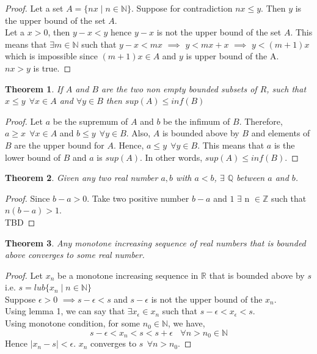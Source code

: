 \documentclass[12pt]{report}
\newtheorem{thm}{Theorem}
\begin{document}
\begin{proof}
    Let a set $A = \{nx \mid n \in \mathbb{N}\}$. Suppose for contradiction $ nx \leq y$. Then $y$ is the upper bound of the set $A$. \\
    Let a $x > 0$, then $ y - x < y$ hence $y - x$ is not the upper bound of the set $A$. This means that $\exists m \in \mathbb{N}$ such that $y - x < mx$ $\implies$ $y < mx + x$ $\implies$ $y < (m+1)x$ which is impossible since $(m+1)x \in A$ and $y$ is upper bound of the A.\\
    $ nx > y$ is true.
\end{proof}
\begin{thm}
    If $A$ and $B$ are the two non empty bounded subsets of $R$, such that $x \leq y ~~ \forall x \in A$ and $\forall y \in B$ then $sup(A) \leq inf(B)$
\end{thm}
\begin{proof}
    Let $a$ be the supremum of $A$ and $b$ be the infimum of $B$. Therefore, \linebreak $a \geq x~~\forall x \in A$ and $ b \leq y~~ \forall y \in B$. Also, $A$ is bounded above by $B$ and elements of $B$ are the upper bound for $A$. Hence, $a \leq y ~~ \forall y \in B$. This means that $a$ is the lower bound of $B$ and $a$ is $sup(A)$. In other words, $sup(A) \leq inf(B)$. 
\end{proof}
\begin{thm}
    Given any two real number $a,b$ with $a<b$, $\exists$ $\mathbb{Q}$ between $a$ and $b$.
\end{thm}
\begin{proof}
    Since $b-a > 0$. Take two positive number $b-a$ and $1$ $\exists$ n $\in \mathbb{Z}$ such that $n(b-a) > 1$.\\ TBD
\end{proof}
\begin{thm}
    Any monotone increasing sequence of real numbers that is bounded above converges to some real number.
\end{thm}
\begin{proof}
    Let $x_n$ be a monotone increasing sequence in $\mathbb{R}$ that is bounded above by $s$ i.e. $s = lub\{x_n \mid n \in \mathbb{N}\}$ \\
    Suppose $\epsilon > 0$ $\implies s - \epsilon < s$ and $s - \epsilon$ is not the upper bound of the $x_n$.\\ 
    Using lemma 1, we can say that $\exists x_\epsilon \in x_n$ such that $s - \epsilon < x_\epsilon < s$.\\
    Using monotone condition, for some $n_0 \in \mathbb{N}$, we have,
    $$ s - \epsilon < x_n < s < s + \epsilon~~~~\forall n > n_0 \in \mathbb{N}$$ Hence $ |x_n - s| < \epsilon$. $x_n$ converges to $s~~\forall n > n_0.$ 
\end{proof}
\end{document}
